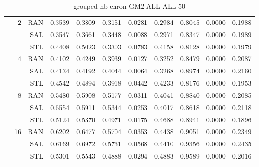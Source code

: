\begin{center}
\begin{table}[htbp]
\begin{tabular}{ | r | r | r | r | r | r | r | r | r | r | r |}
 & \multirow{3}{*}{2} & RAN & 0.3539 & 0.3809 & 0.3151 & 0.0281 & 0.2984 & 0.8045 & 0.0000 & 0.1988\\ \cline{3-11}
 &   & SAL & 0.3547 & 0.3661 & 0.3448 & 0.0088 & 0.2971 & 0.8347 & 0.0000 & 0.1989\\ \cline{3-11}
 &   & STL & 0.4408 & 0.5023 & 0.3303 & 0.0783 & 0.4158 & 0.8128 & 0.0000 & 0.1979\\ \cline{2-11}
 & \multirow{3}{*}{4} & RAN & 0.4102 & 0.4249 & 0.3939 & 0.0127 & 0.3252 & 0.8479 & 0.0000 & 0.2087\\ \cline{3-11}
 &   & SAL & 0.4134 & 0.4192 & 0.4044 & 0.0064 & 0.3268 & 0.8974 & 0.0000 & 0.2160\\ \cline{3-11}
 &   & STL & 0.4542 & 0.4894 & 0.3918 & 0.0442 & 0.4233 & 0.8176 & 0.0000 & 0.1953\\ \cline{2-11}
 & \multirow{3}{*}{8} & RAN & 0.5480 & 0.5908 & 0.5177 & 0.0311 & 0.4041 & 0.8840 & 0.0000 & 0.2085\\ \cline{3-11}
 &   & SAL & 0.5554 & 0.5911 & 0.5344 & 0.0253 & 0.4017 & 0.8618 & 0.0000 & 0.2118\\ \cline{3-11}
 &   & STL & 0.5124 & 0.5370 & 0.4971 & 0.0175 & 0.4688 & 0.8941 & 0.0000 & 0.1896\\ \cline{2-11}
 & \multirow{3}{*}{16} & RAN & 0.6202 & 0.6477 & 0.5704 & 0.0353 & 0.4438 & 0.9051 & 0.0000 & 0.2349\\ \cline{3-11}
 &   & SAL & 0.6169 & 0.6972 & 0.5731 & 0.0568 & 0.4410 & 0.9356 & 0.0000 & 0.2435\\ \cline{3-11}
 &   & STL & 0.5301 & 0.5543 & 0.4888 & 0.0294 & 0.4883 & 0.9589 & 0.0000 & 0.2016\\ \cline{2-11}
\hline
\end{tabular}
\caption{grouped-nb-enron-GM2-ALL-ALL-50}
\end{table}
\end{center}


